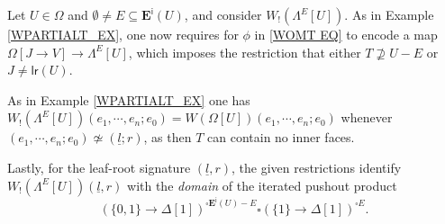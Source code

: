 \documentclass{hha}
\theoremstyle{definition} %
\begin{document}
\begin{example}\label{WPARTIALT2_EX}
	Let $U\in \Omega$ and 
	$\emptyset \neq E \subseteq \boldsymbol{E}^{\mathsf{i}}(U)$,
	and consider $W_!(\Lambda^E[U])$.
	As in Example \ref{WPARTIALT_EX},
	one now requires for $\phi$ in \eqref{WOMT EQ}
	to encode a map
	$\Omega[J \to V] \to \Lambda^E[U]$,
	which imposes the restriction that
	either $T \not \supseteq U-E$ or
	$J \neq \mathsf{lr}(U)$. 
		
	As in Example \ref{WPARTIALT_EX}
	one has 
	$W_!(\Lambda^E[U])(e_1,\cdots,e_n;e_0) = W(\Omega[U])(e_1,\cdots,e_n;e_0)$
	whenever $(e_1,\cdots,e_n;e_0) \not \simeq (\underline{l};r)$,
	as then $T$ can contain no inner faces.

	Lastly, for the leaf-root signature $(\underline{l},r)$,
	the given restrictions identify
	$W_!(\Lambda^E[U])(\underline{l},r)$ 
	with the \emph{domain} of the iterated pushout product
\[
	\left(
	\{0,1\} \to \Delta[1]
	\right)^{\square \boldsymbol{E}^{\mathsf{i}}(U)-E}
	\square
	\left(
	\{1\} \to \Delta[1]
	\right)^{\square E}.
\]
\end{example}





        
\end{document}
